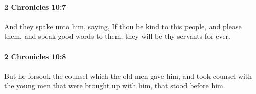 		\paragraph{2 Chronicles 10:7} %
			\label{2CHRONICLES-10-7}

			And they spake unto him, saying, If thou be kind to this people, and please them, and speak good words to them, they will be thy servants for ever.


		\paragraph{2 Chronicles 10:8} %
			\label{2CHRONICLES-10-8}

			But he forsook the counsel which the old men gave him, and took counsel with the young men that were brought up with him, that stood before him.


